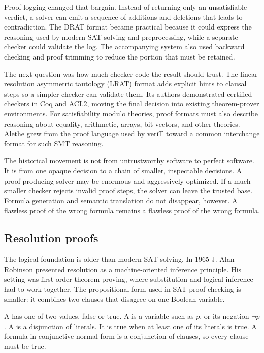 Proof logging changed that bargain. Instead of returning only an
unsatisfiable verdict, a solver can emit a sequence of additions and deletions
that leads to contradiction. The DRAT format became practical because it
could express the reasoning used by modern SAT solving and preprocessing,
while a separate checker could validate the log. The accompanying
 system also used backward checking and proof trimming to
reduce the portion that must be retained.\autocite{wetzler2014drat}

The next question was how much checker code the result should trust. The
linear resolution asymmetric tautology (LRAT) format adds
explicit hints to clausal steps so a simpler checker can validate them. Its
authors demonstrated certified checkers in Coq and ACL2, moving the final
decision into existing theorem-prover environments.\autocite{cruzfilipe2017lrat}
For satisfiability modulo theories, proof formats must also describe reasoning
about equality, arithmetic, arrays, bit vectors, and other theories. Alethe
grew from the proof language used by veriT toward a common interchange format
for such SMT reasoning.\autocite{schurr2021alethe}

The historical movement is not from untrustworthy software to perfect
software. It is from one opaque decision to a chain of smaller, inspectable
decisions. A proof-producing solver may be enormous and aggressively
optimized. If a much smaller checker rejects invalid proof steps, the solver
can leave the trusted base. Formula generation and semantic translation do
not disappear, however. A flawless proof of the wrong formula remains a
flawless proof of the wrong formula.

\subsection{Resolution proofs}

The logical foundation is older than modern SAT solving. In 1965 J. Alan
Robinson presented resolution as a machine-oriented inference principle. His
setting was first-order theorem proving, where substitution and logical
inference had to work together. The propositional form used in SAT proof
checking is smaller: it combines two clauses that disagree on one Boolean
variable.\autocite{robinson1965resolution}

A  has one of two values, false or true. A
 is a variable such as \(p\), or its negation
\(\neg p\). A  is a disjunction of literals. It is true when
at least one of its literals is true. A formula in conjunctive normal form is
a conjunction of clauses, so every clause must be true.

